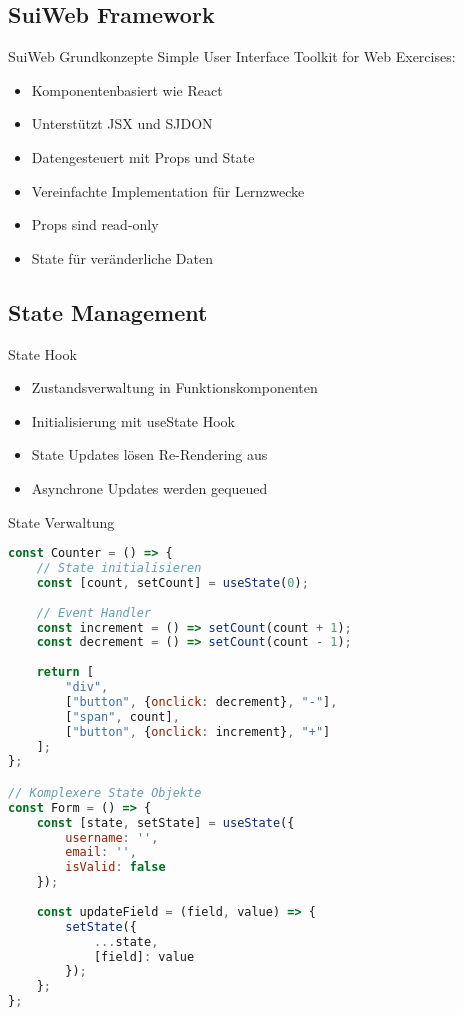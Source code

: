 \subsection{SuiWeb Framework}

\begin{concept}{SuiWeb Grundkonzepte}
    Simple User Interface Toolkit for Web Exercises:
    \begin{itemize}
        \item Komponentenbasiert wie React
        \item Unterstützt JSX und SJDON
        \item Datengesteuert mit Props und State
        \item Vereinfachte Implementation für Lernzwecke
        \item Props sind read-only
        \item State für veränderliche Daten
    \end{itemize}
\end{concept}

\subsection{State Management}

\begin{concept}{State Hook}
    \begin{itemize}
        \item Zustandsverwaltung in Funktionskomponenten
        \item Initialisierung mit useState Hook
        \item State Updates lösen Re-Rendering aus
        \item Asynchrone Updates werden gequeued
    \end{itemize}
\end{concept}

\begin{KR}{State Verwaltung}
\begin{lstlisting}[language=JavaScript, style=basesmol]
const Counter = () => {
    // State initialisieren
    const [count, setCount] = useState(0);
    
    // Event Handler
    const increment = () => setCount(count + 1);
    const decrement = () => setCount(count - 1);
    
    return [
        "div",
        ["button", {onclick: decrement}, "-"],
        ["span", count],
        ["button", {onclick: increment}, "+"]
    ];
};

// Komplexere State Objekte
const Form = () => {
    const [state, setState] = useState({
        username: '',
        email: '',
        isValid: false
    });
    
    const updateField = (field, value) => {
        setState({
            ...state,
            [field]: value
        });
    };
};
\end{lstlisting}
\end{KR}


